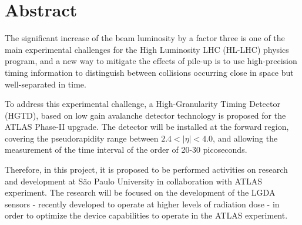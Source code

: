 \chapter*{Abstract}


The significant increase of the beam luminosity by a factor three \cite{tdr} is one of the main experimental challenges for the High Luminosity LHC (HL-LHC) physics program, and a new way to mitigate the effects of pile-up is to use high-precision timing information to distinguish between collisions occurring close in space but well-separated in time.

To address this experimental challenge, a High-Granularity Timing Detector (HGTD), based on low gain avalanche detector technology is proposed for the ATLAS Phase-II upgrade. The detector will be installed at the forward region, covering the pseudorapidity range between $2.4< |\eta| <4.0$, and allowing the measurement of the time interval of the order of 20-30 picoseconds.


Therefore, in this project, it is proposed to be performed activities on research and development at São Paulo University in collaboration with ATLAS experiment. The research will be focused on the development of the LGDA sensors - recently developed to operate at higher levels of radiation dose - in order to optimize the device capabilities to operate in the ATLAS experiment. %